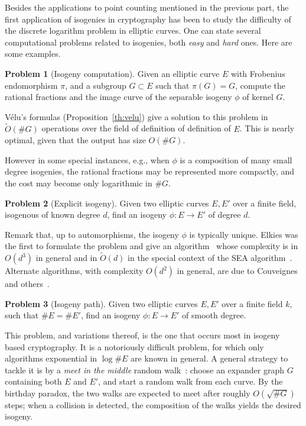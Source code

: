 \documentclass[10pt]{article}
\theoremstyle{plain}
\theoremstyle{definition}
\newtheorem{problem}{Problem}
\def\tildO{\ensuremath{\tilde{O}}}
\begin{document}
Besides the applications to point counting mentioned in the previous
part, the first application of isogenies in cryptography has been to
study the difficulty of the discrete logarithm problem in elliptic
curves. %
One can state several computational problems related to isogenies,
both \emph{easy} and \emph{hard} ones. %
Here are some examples.

\begin{problem}[Isogeny computation]
  Given an elliptic curve $E$ with Frobenius endomorphism $π$, and a
  subgroup $G⊂E$ such that $π(G)=G$, compute the rational fractions
  and the image curve of the separable isogeny $ϕ$ of kernel $G$.
\end{problem}

V\'elu's formulas (Proposition~\ref{th:velu}) give a solution to this
problem in $\tildO(\#G)$ operations over the field of definition of
definition of $E$. %
This is nearly optimal, given that the output has size $O(\#G)$.
  
However in some special instances, e.g., when $ϕ$ is a composition of
many small degree isogenies, the rational fractions may be represented
more compactly, and the cost may become only logarithmic in $\#G$.

\begin{problem}[Explicit isogeny]
  \label{prob:explicit-isog}
  Given two elliptic curves $E,E'$ over a finite field, isogenous
  of known degree $d$, find an isogeny $ϕ:E\to E'$ of degree $d$.
\end{problem}

Remark that, up to automorphisms, the isogeny $ϕ$ is typically
unique. %
Elkies was the first to formulate the problem and give an
algorithm~\cite{elkies92,elkies98} whose complexity is in $O(d^3)$ in
general and in $\tildO(d)$ in the special context of the SEA
algorithm~\cite{bostan+morain+salvy+schost08,lercier+sirvent08}. %
Alternate algorithms, with complexity $O(d^2)$ in general, are due to
Couveignes and
others~\cite{couveignes94,couveignes96,couveignes00,df+schost09,defeo2016explicit}.

\begin{problem}[Isogeny path]
  Given two elliptic curves $E,E'$ over a finite field $k$, such that
  $\#E=\#E'$, find an isogeny $ϕ:E\to E'$ of smooth degree.
\end{problem}

This problem, and variations thereof, is the one that occurs most in
isogeny based cryptography. %
It is a notoriously difficult problem, for which only algorithms
exponential in $\log\#E$ are known in general. %
A general strategy to tackle it is by a \emph{meet in the middle}
random walk~\cite{galbraith99}: choose an expander graph $G$
containing both $E$ and $E'$, and start a random walk from each
curve. %
By the birthday paradox, the two walks are expected to meet after
roughly $O(\sqrt{\#G})$ steps; when a collision is detected, the 
composition of the walks yields the desired isogeny.
\end{document}
